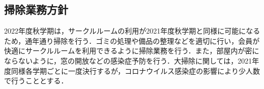 \subsection*{掃除業務方針}


2022年度秋学期は，サークルルームの利用が2021年度秋学期と同様に可能になるため，通年通り掃除を行う．ゴミの処理や備品の整理などを適切に行い，会員が快適にサークルルームを利用できるように掃除業務を行う．また，部屋内が密にならないように，窓の開放などの感染症予防を行う．大掃除に関しては，2021年度同様各学期ごとに一度決行するが，コロナウイルス感染症の影響により少人数で行うこととする．


